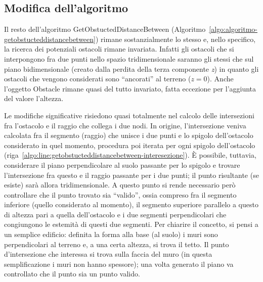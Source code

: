 \subsection{Modifica dell'algoritmo}\label{subsec:modifica-all-algoritmo}
Il resto dell'algoritmo \textsf{GetObstuctedDistanceBetween} (Algoritmo~\ref{algo:algoritmo-getobstucteddistancebetween})
rimane sostanzialmente lo stesso e, nello specifico, la ricerca dei potenziali ostacoli rimane invariata.
Infatti gli ostacoli che si interpongono fra due punti nello spazio tridimensionale saranno gli stessi che sul piano bidimensionale
(creato dalla perdita della terza componente \textit{z}) in quanto gli ostacoli che vengono considerati sono ``ancorati'' al terreno ($z=0$).
Anche l'oggetto \textsf{Obstacle} rimane quasi del tutto invariato, fatta eccezione per l'aggiunta del valore l'altezza.

Le modifiche significative risiedono quasi totalmente nel calcolo delle intersezioni fra l'ostacolo e il raggio che collega i due nodi.
In origine, l'intersezione veniva calcolata fra il segmento (raggio) che unisce i due punti e lo spigolo dell'ostacolo considerato in quel
momento, procedura poi iterata per ogni spigolo dell'ostacolo (riga~\ref{algo:line:getobstucteddistancebetween-interesezione}).
È possibile, tuttavia, considerare il piano perpendicolare al suolo passante per lo spigolo e trovare l'intersezione fra questo
e il raggio passante per i due punti; il punto risultante (se esiste) sarà allora tridimensionale.
A questo punto si rende necessario però controllare che il punto trovato sia ``valido'', ossia compreso fra il segmento inferiore
(quello considerato al momento), il segmento superiore parallelo a questo di altezza pari a quella dell'ostacolo e i due segmenti
perpendicolari che congiungono le estemità di questi due segmenti.
Per chiarire il concetto, si pensi a un semplice edificio: definita la forma alla base (al suolo) i muri sono perpendicolari
al terreno e, a una certa altezza, si trova il tetto.
Il punto d'intersezione che interessa si trova sulla faccia del muro (in questa semplificazione i muri non hanno spessore);
una volta generato il piano va controllato che il punto sia un punto valido.

